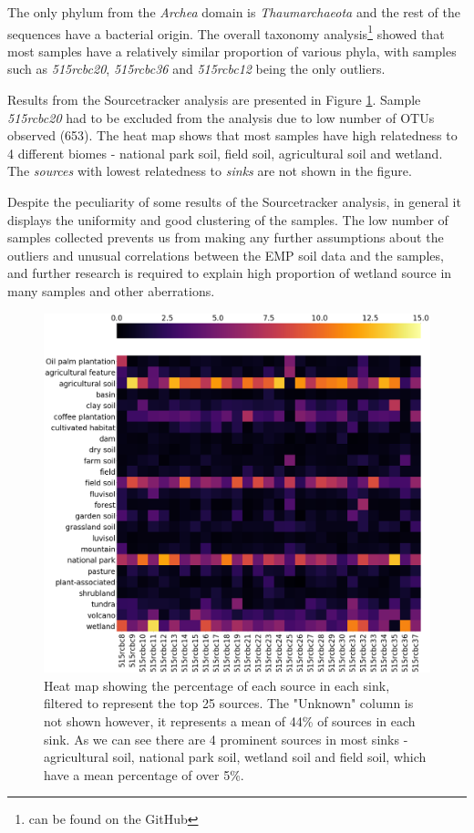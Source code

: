 \documentclass[12pt,twocolumn]{article} %
\begin{document}
\par
The only phylum from the \textit{Archea} domain is \textit{Thaumarchaeota} and the rest of the sequences have a bacterial origin. The overall taxonomy analysis\footnote{can be found on the GitHub\cite{Anonymous2018}} showed that most samples have a relatively similar proportion of various phyla, with samples such as \textit{515rcbc20}, \textit{515rcbc36} and \textit{515rcbc12} being the only outliers.
\par
Results from the Sourcetracker analysis are presented in Figure \ref{fig:Sourcetracker_heatmap}. Sample \textit{515rcbc20} had to be excluded from the analysis due to low number of OTUs observed (653). The heat map shows that most samples have high relatedness to 4 different biomes - national park soil, field soil, agricultural soil and wetland. The \textit{sources} with lowest relatedness to \textit{sinks} are not shown in the figure. 
\par
Despite the peculiarity of some results of the Sourcetracker analysis, in general it displays the uniformity and good clustering of the samples. The low number of samples collected prevents us from making any further assumptions about the outliers and unusual correlations between the EMP soil data and the samples, and further research is required to explain high proportion of wetland source in many samples and other aberrations.
\begin{figure}[ht!] %
	\includegraphics[width=\linewidth]{heatmap_perc.png}
	\caption{Heat map showing the percentage of each source in each sink, filtered to represent the top 25 sources. The "Unknown" column is not shown however, it represents a mean of 44\% of sources in each sink. As we can see there are 4 prominent sources in most sinks - agricultural soil, national park soil, wetland soil and field soil, which have a mean percentage of over 5\%.}
	\label{fig:Sourcetracker_heatmap}
\end{figure}
%
%
\end{document}
